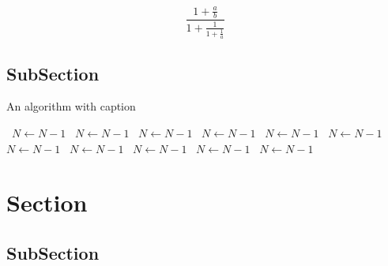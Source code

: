 \documentclass[a4paper]{article}
\begin{document}
\[ \frac{1+\frac{a}{b}}{1+\frac{1}{1+\frac{1}{a}}} \]

\subsection{SubSection}

\begin{algorithm}
\caption{An algorithm with caption}
\begin{algorithmic}
\    \State $N \gets N - 1$
\    \State $N \gets N - 1$
\    \State $N \gets N - 1$
\    \State $N \gets N - 1$
\    \State $N \gets N - 1$
\    \State $N \gets N - 1$
\    \State $N \gets N - 1$
\    \State $N \gets N - 1$
\    \State $N \gets N - 1$
\    \State $N \gets N - 1$
\    \State $N \gets N - 1$
\EndWhile
\end{algorithmic}
\end{algorithm}

\section{Section}

\subsection{SubSection}
\end{document}

